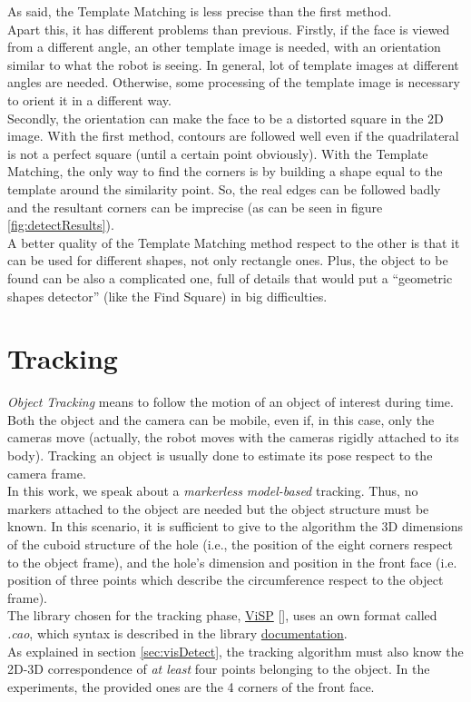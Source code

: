 As said, the Template Matching is less precise than the first method.\\
Apart this, it has different problems than previous. Firstly, if the face is viewed from a different angle, an other template image is needed, with an orientation similar to what the robot is seeing. In general, lot of template images at different angles are needed. Otherwise, some processing of the template image is necessary to orient it in a different way.\\

Secondly, the orientation can make the face to be a distorted square in the 2D image. With the first method, contours are followed well even if the quadrilateral is not a perfect square (until a certain point obviously). With the Template Matching, the only way to find the corners is by building a shape equal to the template around the similarity point. So, the real edges can be followed badly and the resultant corners can be imprecise (as can be seen in figure \ref{fig:detectResults}).\\

A better quality of the Template Matching method respect to the other is that it can be used for different shapes, not only rectangle ones. Plus, the object to be found can be also a complicated one, full of details that would put a \enquote{geometric shapes detector} (like the Find Square) in big difficulties.\\


\section{Tracking}
\label{sec:visTracking}
\textit{Object Tracking} means to follow the motion of an object of interest during time. Both the object and the camera can be mobile, even if, in this case, only the cameras move (actually, the robot moves with the cameras rigidly attached to its body). Tracking an object is usually done to estimate its pose respect to the camera frame.\\

In this work, we speak about a \textit{markerless} \textit{model-based} tracking. Thus, no markers attached to the object are needed but the object structure must be known. In this scenario, it is sufficient to give to the algorithm the 3D dimensions of the cuboid structure of the hole (i.e., the position of the eight corners respect to the object frame), and the hole's dimension and position in the front face (i.e. position of three points which describe the circumference respect to the object frame).\\
The library chosen for the tracking phase, \href{https://visp.inria.fr/}{ViSP} [\cite{visp}], uses an own format called \textit{.cao}, which syntax is described in the library  \href{https://visp-doc.inria.fr/doxygen/visp-daily/tutorial-tracking-mb-generic.html#mb_generic_advanced_cao}{documentation}.\\
As explained in section \ref{sec:visDetect}, the tracking algorithm must also know the 2D-3D correspondence of \textit{at least} four points belonging to the object. In the experiments, the provided ones are the 4 corners of the front face.\\

